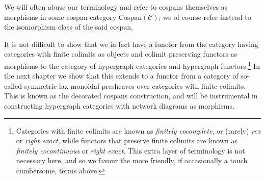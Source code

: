 We will often abuse our terminology and refer to cospans themselves as
morphisms in some cospan category $\mathrm{Cospan}(\mathcal C)$; we of course
refer instead to the isomorphism class of the said cospan.

It is not difficult to show that we in fact have a functor from the category
having categories with finite colimits as objects and colimit preserving
functors as morphisms to the category of hypergraph categories and hypergraph
functors.\footnote{Categories with finite colimits are known as \emph{finitely
cocomplete}, or (rarely) \emph{rex} or \emph{right exact}, while functors that
preserve finite colimits are known as \emph{finitely cocontinuous} or
\emph{right exact}. This extra layer of terminology is not necessary here, and
so we favour the more friendly, if occasionally a touch cumbersome, terms
above.} In the next chapter we show that this extends to a functor from a
category of so-called symmetric lax monoidal presheaves over categories with
finite colimits. This is known as the decorated cospans construction, and will
be instrumental in constructing hypergraph categories with network diagrams as
morphisms.







